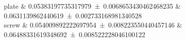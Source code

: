 plate 		&		\num{0.05383197735317979 \pm 0.0068653430462468235} 		&		\num{0.0631139862440619 \pm 0.002733168981340528}	 \\ 
screw 		&		\num{0.054009892222697954 \pm 0.008223550440457146} 		&		\num{0.06488331619348692 \pm 0.008522228046100122}	 \\ 
